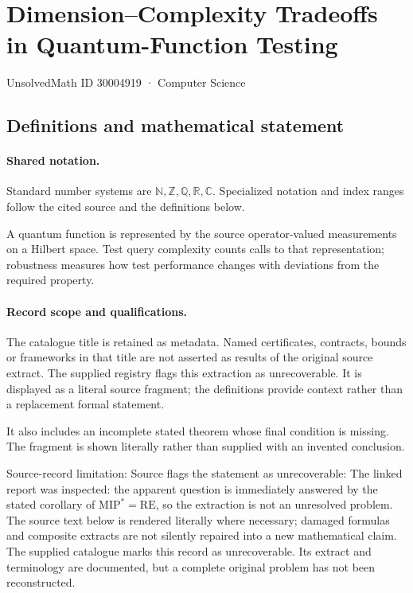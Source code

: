 \documentclass[11pt]{article}
\begin{document}
\setcounter{section}{30004918}
\section{Dimension–Complexity Tradeoffs in Quantum-Function Testing}\label{30004919}
{\small\sffamily UnsolvedMath ID 30004919 · Computer Science}
\subsection{Definitions and mathematical statement}

\paragraph{Shared notation.}Standard number systems are $\mathbb N,\mathbb Z,\mathbb Q,\mathbb R,\mathbb C$. Specialized notation and index ranges follow the cited source and the definitions below.


A quantum function is represented by the source operator-valued measurements on a Hilbert space. Test query complexity counts calls to that representation; robustness measures how test performance changes with deviations from the required property.
\paragraph{Record scope and qualifications.}
The catalogue title is retained as metadata. Named certificates, contracts, bounds or frameworks in that title are not asserted as results of the original source extract.
The supplied registry flags this extraction as unrecoverable. It is displayed as a literal source fragment; the definitions provide context rather than a replacement formal statement.

It also includes an incomplete stated theorem whose final condition is missing. The fragment is shown literally rather than supplied with an invented conclusion.

Source-record limitation: Source flags the statement as unrecoverable: The linked report was inspected: the apparent question is immediately answered by the stated corollary of $\mathrm{MIP}^*=\mathrm{RE}$, so the extraction is not an unresolved problem.
The source text below is rendered literally where necessary; damaged formulas and composite extracts are not silently repaired into a new mathematical claim.
The supplied catalogue marks this record as unrecoverable. Its extract and terminology are documented, but a complete original problem has not been reconstructed.
\end{document}
